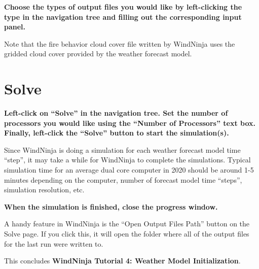 \documentclass[12pt]{article}
\begin{document}
\textbf{\color{red}Choose the types of output files you would like by left-clicking the type in the navigation tree and filling out the corresponding input panel.}

Note that the fire behavior cloud cover file written by WindNinja uses the gridded cloud cover provided by the weather forecast model.

\section{Solve}

\textbf{\color{red} Left-click on “Solve” in the navigation tree.  Set the number of processors you would like using the “Number of Processors” text box.  Finally, left-click the “Solve” button to start the simulation(s).}

Since WindNinja is doing a simulation for each weather forecast model time “step”, it may take a while for WindNinja to complete the simulations.  Typical simulation time for an average dual core computer in 2020 should be around 1-5 minutes depending on the computer, number of forecast model time “steps”, simulation resolution, etc.

\textbf{\color{red} When the simulation is finished, close the progress window.}

A handy feature in WindNinja is the “Open Output Files Path” button on the Solve page.  If you click this, it will open the folder where all of the output files for the last run were written to.

This concludes \textbf{WindNinja Tutorial 4: Weather Model Initialization}.
\end{document}

